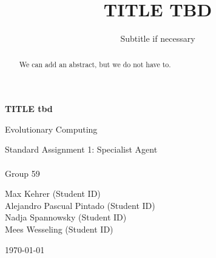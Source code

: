 \documentclass[sigconf]{acmart}
\begin{document}
\begin{titlepage}
    \centering
    \vspace*{1cm}

    \Huge
    \textbf{TITLE tbd}

    \vspace{0.5cm}
    \LARGE
    Evolutionary Computing

    \vspace{1.5cm}
    Standard Assignment 1: Specialist Agent \\ \\
    Group 59

    \vspace{1.5cm}
    Max Kehrer (Student ID)\\
    Alejandro Pascual Pintado (Student ID)\\
    Nadja Spannowsky (Student ID)\\
    Mees Wesseling (Student ID)

    \vspace{1.5cm}
    \today

    \vfill
\end{titlepage}

\title{TITLE TBD}
\subtitle{Subtitle if necessary}

\begin{abstract}
We can add an abstract, but we do not have to.
\end{abstract}


\maketitle



\clearpage

%

\end{document}
